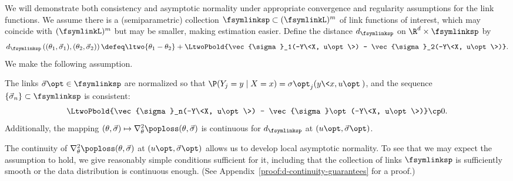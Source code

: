 We will demonstrate both consistency and
asymptotic normality under appropriate convergence and regularity
assumptions for the link functions. We assume there is a (semiparametric)
collection $\fsymlinksp \subset (\fsymlinkL)^m$ of link functions of
interest, which may coincide with $(\fsymlinkL)^m$ but may be smaller,
making estimation easier.  Define the distance $d_{\fsymlinksp}$ on $\R^d
\times \fsymlinksp$ by
\begin{align}
  d_{\fsymlinksp}\left((\theta_1, \vec{\sigma}_1), (\theta_2, \vec{\sigma}_2)
  \right)
  \defeq
  \ltwo{\theta_1 - \theta_2}
  + \LtwoPbold{\vec{\sigma}_1(-Y\<X, u\opt\>)
    - \vec{\sigma}_2(-Y\<X, u\opt\>)}.
  \label{eqn:link-distance}
\end{align}
We make the following assumption.
\begin{assumption}
  \label{assumption:sp-general}
  The links $\vec{\sigma}\opt \in \fsymlinksp$ are normalized so
  that $\P(Y_j = y \mid X = x) = \sigma\opt_j(y \<x, u\opt\>)$, and
  the sequence $\{\vec{\sigma}_n\} \subset \fsymlinksp$ is consistent:
  \begin{equation*}
    \LtwoPbold{\vec{\sigma}_n(-Y\<X, u\opt\>)
      - \vec{\sigma}\opt(-Y\<X, u\opt\>)}
    \cp 0.
  \end{equation*}
  Additionally, the mapping $(\theta, \vec{\sigma}) \mapsto
  \nabla_\theta^2 \poploss(\theta,
  \vec{\sigma})$ is continuous for $d_{\fsymlinksp}$ at $(u\opt,
  \vec{\sigma}\opt)$.
\end{assumption}
The continuity of $\nabla_\theta^2 \poploss(\theta, \vec{\sigma})$ at
$(u\opt, \vec{\sigma}\opt)$ allows us to develop local asymptotic normality.
To see that we may expect the assumption to hold, we give reasonably simple
conditions sufficient for it, including that the collection of links
$\fsymlinksp$ is sufficiently smooth or the data distribution is continuous
enough. (See Appendix~\ref{proof:d-continuity-guarantees} for a proof.)

